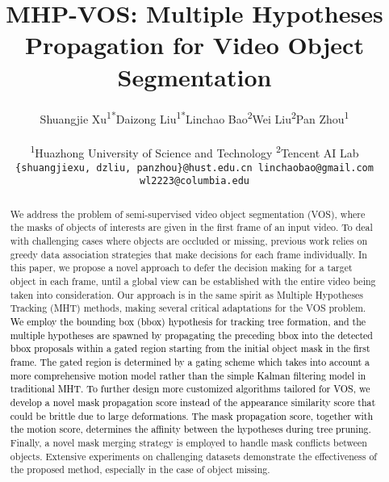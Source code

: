 \documentclass[10pt,twocolumn,letterpaper]{article}
\newcommand{\ldz}[1]{\textcolor{black}{#1}}
\begin{document}
\title{MHP-VOS: Multiple Hypotheses Propagation for Video Object Segmentation}

\author{
	\begin{tabular}{ p{2.8cm}<{\centering} p{2.8cm}<{\centering} p{2.8cm}<{\centering}p{2.8cm}<{\centering} p{2.8cm}<{\centering}}
Shuangjie Xu\textsuperscript{1*} & Daizong Liu\textsuperscript{1*}  & Linchao Bao\textsuperscript{2} & Wei Liu\textsuperscript{2} & Pan Zhou\textsuperscript{1}
\end{tabular}\\
\textsuperscript{1}Huazhong University of Science and Technology  \quad  \textsuperscript{2}Tencent AI Lab\\
{\tt\small \{shuangjiexu, dzliu, panzhou\}@hust.edu.cn  \quad  linchaobao@gmail.com \quad  wl2223@columbia.edu}\\
}


\maketitle
\thispagestyle{empty}

\begin{abstract}
\vspace{-4pt}
We address the problem of semi-supervised video object segmentation (VOS), where the masks of objects of interests are given in the first frame of an input video.
To deal with challenging cases where objects are occluded or missing, previous work relies on greedy data association strategies that make decisions for each frame individually.
In this paper, we propose a novel approach to defer the decision making for a target object in each frame, until a global view can be established with the entire video being taken into consideration. 
Our approach is in the same spirit as Multiple Hypotheses Tracking (MHT) methods, making several critical adaptations for the VOS problem.
\ldz{
We employ the bounding box (bbox) hypothesis for tracking tree formation,
and the multiple hypotheses are spawned by propagating the preceding bbox into the detected bbox proposals within a gated region starting from the initial object mask in the first frame.
The gated region is determined by a gating scheme which takes into account a more comprehensive motion model rather than the simple Kalman filtering model in traditional MHT.
To further design more customized algorithms tailored for VOS, we develop a novel mask propagation score instead of the appearance similarity score that could be brittle due to large deformations. The mask propagation score, together with the motion score,  determines the affinity between the hypotheses during tree pruning.
}
Finally, a novel mask merging strategy is employed to handle mask conflicts between objects. 
Extensive experiments on challenging datasets demonstrate the effectiveness of the proposed method, especially in the case of object missing.
\vspace{-10pt}
\end{abstract}
\end{document}

